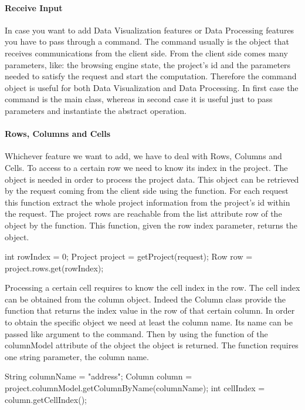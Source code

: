 \paragraph{Receive Input} In case you want to add Data Visualization features or Data Processing features you have to pass through a command. The command usually is the object that receives communications from the client side. From the client side comes many parameters, like: the browsing engine state, the project's id and the parameters needed to satisfy the request and start the computation. Therefore the command object is useful for both Data Visualization and Data Processing. In first case the command is the main class, whereas in second case it is useful just to pass parameters and instantiate the abstract operation.

\paragraph{Rows, Columns and Cells} Whichever feature we want to add, we have to deal with Rows, Columns and Cells. To access to a certain row we need to know its index in the project. The  object is needed in order to process the project data. This object can be retrieved by the request coming from the client side using the  function. For each request this function extract the whole project information from the project's id within the request. 
The project rows are reachable from the list attribute row of the  object by the  function. This function, given the row index parameter, returns the  object. 
\begin{code}
int rowIndex = 0;
Project project = getProject(request);
Row row = project.rows.get(rowIndex);
\end{code}
Processing a certain cell requires to know the cell index in the row. The cell index can be obtained from the column object. Indeed the Column class provide the  function that returns the index value in the row of that certain column. In order to obtain the specific  object we need at least the column name. Its name can be passed like argument to the command. Then by using the  function of the columnModel attribute of the  object the  object is returned. The  function requires one string parameter, the column name.
\begin{code}
String columnName = "address";
Column column = 
     project.columnModel.getColumnByName(columnName);
int cellIndex = column.getCellIndex();
\end{code}
